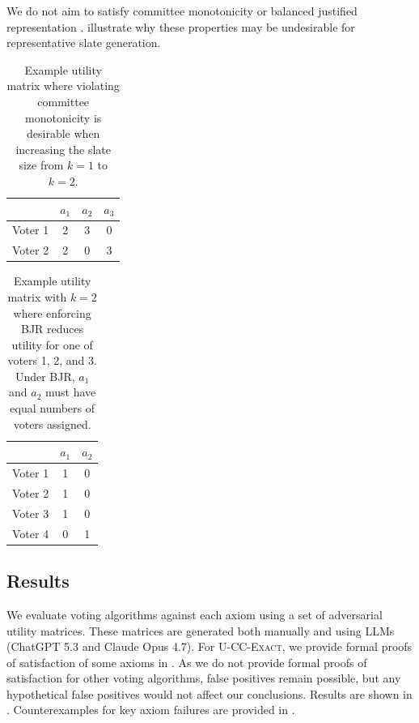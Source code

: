 \documentclass[letterpaper]{article} %
\newcommand{\Exact}{\textsc{U-CC-Exact}}
\begin{document}
We do not aim to satisfy committee monotonicity \citep{elkind-committee-monotonicity} or balanced justified representation \citep{fish-v2}.
 illustrate why these properties may be undesirable for representative slate generation.

\begin{table}[t]
\centering
\begin{tabular}{l|ccc}
\hline
 & $a_1$ & $a_2$ & $a_3$ \\
\hline
Voter 1 & 2 & 3 & 0 \\
Voter 2 & 2 & 0 & 3 \\
\hline
\end{tabular}
\caption{Example utility matrix where violating committee monotonicity is desirable when increasing the slate size from \(k=1\) to \(k=2\).}
\label{tab:committee-monotonicity-example}
\end{table}

\begin{table}[t]
\centering
\begin{tabular}{l|cc}
\hline
 & $a_1$ & $a_2$ \\
\hline
Voter 1 & 1 & 0 \\
Voter 2 & 1 & 0 \\
Voter 3 & 1 & 0 \\
Voter 4 & 0 & 1 \\
\hline
\end{tabular}
\caption{Example utility matrix with \(k=2\) where enforcing BJR reduces utility for one of voters 1, 2, and 3.
Under BJR, \(a_1\) and \(a_2\) must have equal numbers of voters assigned.}
\label{tab:bjr-example}
\end{table}

\subsection{Results}
\label{app:axiom-results}

We evaluate voting algorithms against each axiom using a set of adversarial utility matrices.
These matrices are generated both manually and using LLMs (ChatGPT 5.3 and Claude Opus 4.7).
For \Exact{}, we provide formal proofs of satisfaction of some axioms in .
As we do not provide formal proofs of satisfaction for other voting algorithms, false positives remain possible, but any hypothetical false positives would not affect our conclusions.
Results are shown in .
Counterexamples for key axiom failures are provided in .
\end{document}
